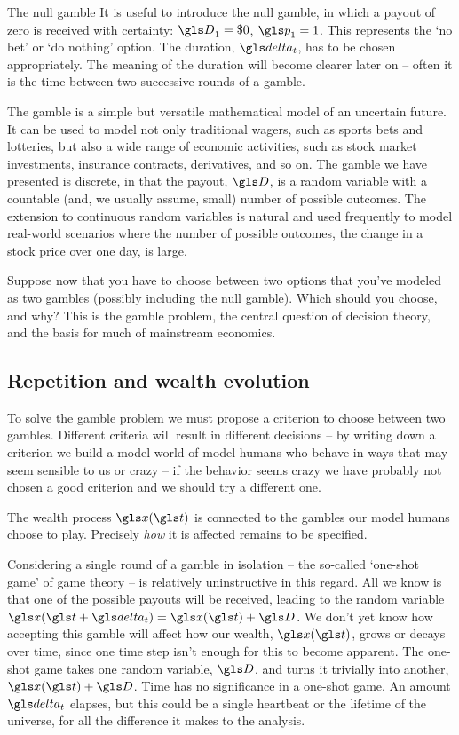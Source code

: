 \begin{example}{The null gamble}
It is useful to introduce the null gamble, in which a payout of zero is received 
with certainty: $\gD_1=\$0$, $\p_1=1$. This represents the `no bet' or `do nothing' option.
The duration, $\dt$, has to be chosen appropriately. The meaning of the
duration will become clearer later on -- often it is the time between two successive rounds
of a gamble.
\end{example}

The gamble is a simple but versatile mathematical model of an uncertain future. 
It can be used to model not only traditional wagers, such as sports bets and 
lotteries, but also a wide range of economic activities, such as stock market 
investments, insurance contracts, derivatives, and so on. The gamble we have 
presented is discrete, in that the payout, $\gD$, is a random variable with a 
countable (and, we usually assume, small) number of possible outcomes. 
The extension to continuous random variables is natural and used frequently 
to model real-world scenarios where the number of possible outcomes, \eg the change 
in a stock price over one day, is large.

Suppose now that you have to choose between two options that you've modeled 
as two gambles (possibly including the null gamble). Which should you choose, 
and why? This is the gamble problem, the central question of decision theory, and 
the basis for much of mainstream economics.

\subsection{Repetition and wealth evolution}
To solve the gamble problem we must propose a criterion to choose between two
gambles. Different criteria will result in different decisions -- by writing down a criterion
we build a model world of model humans who behave in ways that may seem sensible
to us or crazy -- if the behavior seems crazy we have probably not chosen a good
criterion and we should try a different one.

The wealth process $\x(\t)$ is connected to the gambles our model humans 
choose to play. Precisely {\it how} it is affected remains to be specified.

Considering a single round of a gamble in isolation -- the so-called `one-shot 
game' of game theory -- is relatively uninstructive in this regard. All we know is 
that one of the possible payouts will be received, leading to the random variable 
$\x(\t+\dt)=\x(\t)+\gD$. 
We don't yet know how accepting this gamble will affect how our wealth, $\x(\t)$, grows or decays over time, since one time step isn't enough for this to become apparent. 
The one-shot game takes one random variable, $\gD$, and turns it trivially into 
another, $\x(\t)+\gD$. Time has no significance in a 
one-shot game. An amount $\dt$ elapses, but this could be a single 
heartbeat or the lifetime of the universe, for all the difference it makes to the analysis.

